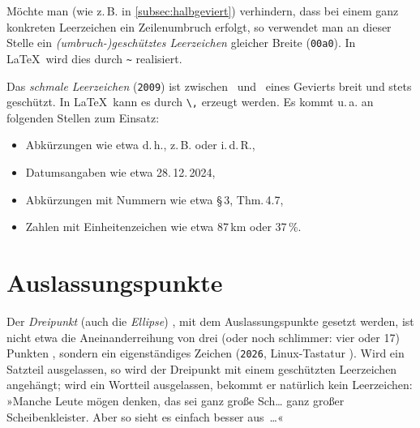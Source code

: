 Möchte man (wie z.\,B. in \cref{subsec:halbgeviert}) verhindern, dass bei einem
ganz konkreten Leerzeichen ein Zeilenumbruch erfolgt, so verwendet man an dieser
Stelle ein \emph{(umbruch-)geschütztes Leerzeichen} gleicher Breite
(\texttt{00a0}). In \LaTeX\ wird dies durch \verb!~! realisiert.

Das \emph{schmale Leerzeichen} (\texttt{2009}) ist zwischen \ und
\ eines Gevierts breit und stets geschützt. In \LaTeX\ kann
es durch \verb!\,! erzeugt werden. Es kommt u.\,a. an folgenden Stellen zum Einsatz:
\begin{itemize}[nosep]
\item Abkürzungen wie etwa d.\,h., z.\,B. oder i.\,d.\,R.,
\item Datumsangaben wie etwa 28.\,12.\,2024,
\item Abkürzungen mit Nummern wie etwa §\,3, Thm.\,4.7,
\item Zahlen mit Einheitenzeichen wie etwa 87\,km oder 37\,\%.
\end{itemize}


\section{Auslassungspunkte}

Der \emph{Dreipunkt} (auch die \emph{Ellipse}) , mit dem
Auslassungspunkte gesetzt werden, ist nicht etwa die Aneinanderreihung
von drei (oder noch schlimmer: vier oder 17) Punkten ,
sondern ein eigenständiges Zeichen (\texttt{2026}, Linux-Tastatur
).  Wird ein Satzteil ausgelassen, so wird der
Dreipunkt mit einem geschützten Leerzeichen angehängt; wird ein
Wortteil ausgelassen, bekommt er natürlich kein Leerzeichen: »Manche
Leute mögen denken, das sei ganz große Sch… ganz großer
Scheibenkleister.  Aber so sieht es einfach besser aus~…«

